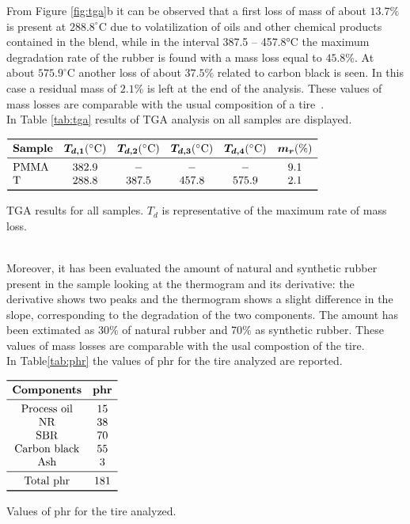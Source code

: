 \documentclass[a4paper, 11pt]{article}
\begin{document}
\newpage

From Figure \ref{fig:tga}b it can be observed that a first loss of mass of about $13.7\%$ is present at $288.8^\circ$C due to volatilization of oils and other chemical products contained in the blend, while in the interval 387.5 – 457.8°C the maximum degradation rate of the rubber is found with a mass loss equal to $45.8\%$. At about $575.9^\circ$C another loss of about $37.5\%$ related to carbon black is seen. In this case a residual mass of $2.1\%$ is left at the end of the analysis. These values of mass losses are comparable with the usual composition of a tire~\cite{gommista}.\\
In Table \ref{tab:tga} results of TGA analysis on all samples are displayed. 
\begin{table}[htp]
\centering
$
\begin{array}{lccccc}
\toprule
\textbf{Sample}  & \bm{T_{d,1}} (\SI{}{\celsius}) & \bm{T_{d,2}} (\SI{}{\celsius}) & \bm{T_{d,3}} (\SI{}{\celsius}) & \bm{T_{d,4}} (\SI{}{\celsius}) & \bm{m_{r}} (\si{\%}) \\
\midrule
\text{PMMA}  & 382.9 & - & - & - & 9.1  \\
\text{T}  & 288.8 & 387.5 & 457.8 & 575.9 & 2.1  \\
\bottomrule
\end{array}
$
\caption{TGA results for all samples. $T_d$ is representative of the maximum rate of mass loss.}
\label{tab:tga}
\end{table}\\
Moreover, it has been evaluated the amount of natural and synthetic rubber present in the sample looking at the thermogram and its derivative: the derivative shows two peaks and the thermogram shows a slight difference in the slope, corresponding to the degradation of the two components. The amount has been extimated as 30\% of natural rubber and 70\% as synthetic rubber. These values of mass losses are comparable with the usal compostion of the tire. \\
In Table\ref{tab:phr} the values of phr for the tire analyzed are reported.

\begin{table}[htp]
\centering
$
\begin{array}{ccc}
\toprule
\textbf{Components} & \textbf{phr} \\
\midrule
\text{Process oil} & 15 \\
\text{NR} & 38\\
\text{SBR} & 70 \\
\text{Carbon black} & 55 \\
\text{Ash}& 3\\
\midrule
\text {Total phr}& 181\\
\bottomrule
\end{array}
$
\caption{Values of phr for the tire analyzed.}
\label{tab:phr}
\end{table}
\end{document}
